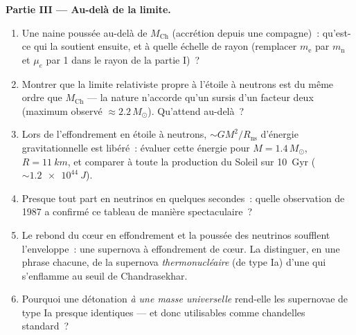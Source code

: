\begin{problem}
\medskip\noindent\textbf{Partie III --- Au-delà de la limite.}
\begin{enumerate}[resume]
  \item Une naine poussée au-delà de $M_{\text{Ch}}$ (accrétion
        depuis une compagne)~: qu'est-ce qui la soutient ensuite, et
        à quelle échelle de rayon (remplacer $m_{\text{e}}$ par
        $m_{\text{n}}$ et $\mu_e$ par 1 dans le rayon de la partie
        I)~?
  \item Montrer que la limite relativiste propre à l'étoile à
        neutrons est du même ordre que $M_{\text{Ch}}$ --- la nature
        n'accorde qu'un sursis d'un facteur deux (maximum observé
        $\approx
        2.2\,M_\odot$). Qu'attend au-delà~?
  \item Lors de l'effondrement en étoile à neutrons, $\sim GM^2/R_{
        \text{ns}}$ d'énergie gravitationnelle est libéré~: évaluer
        cette énergie pour $M = 1.4\,M_\odot$, $R = \qty{11}{km}$,
        et comparer à toute la production du Soleil sur
        \qty{10}{Gyr} ($\sim\qty{1.2e44}{J}$).
  \item Presque tout part en neutrinos en quelques secondes~:
        quelle observation de 1987 a confirmé ce tableau de manière
        spectaculaire~?
  \item Le rebond du cœur en effondrement et la poussée des
        neutrinos soufflent l'enveloppe~: une supernova à
        effondrement de cœur. La distinguer, en une phrase chacune,
        de la supernova \emph{thermonucléaire} (de type Ia) d'une
         qui s'enflamme au seuil de Chandrasekhar.
  \item Pourquoi une détonation \emph{à une masse universelle}
        rend-elle les supernovae de type Ia presque identiques ---
        et donc utilisables comme chandelles standard~?
\end{enumerate}


\end{problem}
